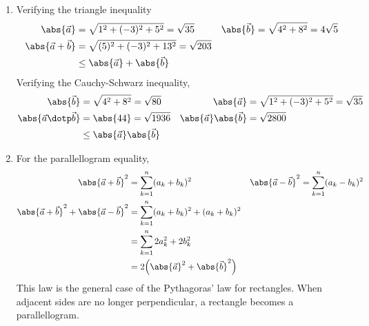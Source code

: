 \begin{enumerate}
      \item Verifying the triangle inequality
            \begin{align}
                  \abs{\vec{a}}           & = \sqrt{1^2 + (-3)^2 + 5^2} = \sqrt{35} &
                  \abs{\vec{b}}           & = \sqrt{4^2 + 8^2} = 4\sqrt{5}            \\
                  \abs{\vec{a} + \vec{b}} &
                  = \sqrt{(5)^2 + (-3)^2 + 13^2} = \sqrt{203}                         \\
                                          & \leq \abs{\vec{a}} + \abs{\vec{b}}
            \end{align}
            Verifying the Cauchy-Schwarz inequality,
            \begin{align}
                  \abs{\vec{b}}               & = \sqrt{4^2 + 8^2}
                  = \sqrt{80}                 &
                  \abs{\vec{a}}               & = \sqrt{1^2 + (-3)^2 + 5^2}
                  = \sqrt{35}                                                      \\
                  \abs{\vec{a}
                  \dotp \vec{b}}              & = \abs{44} = \sqrt{1936}         &
                  \abs{\vec{a}} \abs{\vec{b}} & = \sqrt{2800}                      \\
                                              & \leq \abs{\vec{a}} \abs{\vec{b}}
            \end{align}

      \item For the parallellogram equality,
            \begin{align}
                  \abs{\vec{a} + \vec{b}}^2                             &
                  = \sum_{k=1}^{n} (a_k + b_k)^2                        &
                  \abs{\vec{a} - \vec{b}}^2                             &
                  = \sum_{k=1}^{n} (a_k - b_k)^2                          \\
                  \abs{\vec{a} + \vec{b}}^2 + \abs{\vec{a} - \vec{b}}^2 &
                  = \sum_{k=1}^{n} (a_k + b_k)^2 + (a_k + b_k)^2          \\
                                                                        &
                  = \sum_{k=1}^{n} 2a_k^2 + 2b_k^2                        \\
                                                                        &
                  = 2\Big( \abs{\vec{a}}^2 + \abs{\vec{b}}^2 \Big)
            \end{align}
            This law is the general case of the Pythagoras' law for rectangles. When
            adjacent sides are no longer perpendicular, a rectangle becomes a
            parallellogram.


\end{enumerate}
